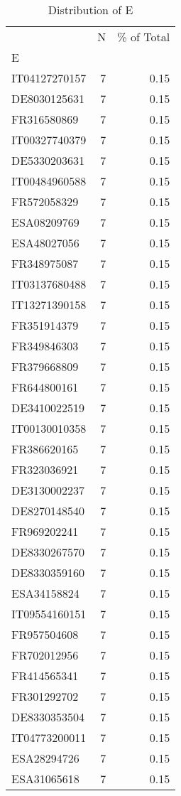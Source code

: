 \begin{table*}[htbp]
\centering
\small
\caption{Distribution of E}
\label{tab:dist_e}
\begin{tabular}{lrr}
\toprule
 & N & \% of Total \\
E &  &  \\
\midrule
IT04127270157 & 7 & 0.15 \\
DE8030125631 & 7 & 0.15 \\
FR316580869 & 7 & 0.15 \\
IT00327740379 & 7 & 0.15 \\
DE5330203631 & 7 & 0.15 \\
IT00484960588 & 7 & 0.15 \\
FR572058329 & 7 & 0.15 \\
ESA08209769 & 7 & 0.15 \\
ESA48027056 & 7 & 0.15 \\
FR348975087 & 7 & 0.15 \\
IT03137680488 & 7 & 0.15 \\
IT13271390158 & 7 & 0.15 \\
FR351914379 & 7 & 0.15 \\
FR349846303 & 7 & 0.15 \\
FR379668809 & 7 & 0.15 \\
FR644800161 & 7 & 0.15 \\
DE3410022519 & 7 & 0.15 \\
IT00130010358 & 7 & 0.15 \\
FR386620165 & 7 & 0.15 \\
FR323036921 & 7 & 0.15 \\
DE3130002237 & 7 & 0.15 \\
DE8270148540 & 7 & 0.15 \\
FR969202241 & 7 & 0.15 \\
DE8330267570 & 7 & 0.15 \\
DE8330359160 & 7 & 0.15 \\
ESA34158824 & 7 & 0.15 \\
IT09554160151 & 7 & 0.15 \\
FR957504608 & 7 & 0.15 \\
FR702012956 & 7 & 0.15 \\
FR414565341 & 7 & 0.15 \\
FR301292702 & 7 & 0.15 \\
DE8330353504 & 7 & 0.15 \\
IT04773200011 & 7 & 0.15 \\
ESA28294726 & 7 & 0.15 \\
ESA31065618 & 7 & 0.15 \\

\end{tabular}
\end{table*}
